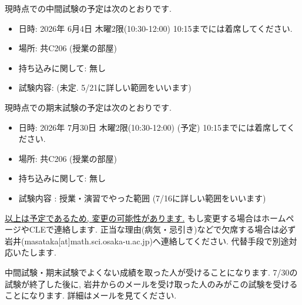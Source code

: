 \documentclass[dvipdfmx,a4paper,11pt]{article} %
\theoremstyle{definition}
\begin{document}
\medskip
{}

現時点での中間試験の予定は次のとおりです. 


\begin{tcolorbox}[mybox]
\begin{itemize}
  \setlength{\parskip}{0cm} 
  \setlength{\itemsep}{0cm}
\item 日時: 2026年 6月4日 木曜2限(10:30-12:00) 10:15までには着席してください.
\item 場所: 共C206 (授業の部屋)
\item 持ち込みに関して: 無し
\item 試験内容: (未定. 5/21に詳しい範囲をいいます)
\end{itemize}
\end{tcolorbox}

\medskip
{}

現時点での期末試験の予定は次のとおりです.

\begin{tcolorbox}[mybox] 
\begin{itemize}
  \setlength{\parskip}{0cm} 
  \setlength{\itemsep}{0cm}
\item 日時: 2026年 7月30日 木曜2限(10:30-12:00)  (予定) 10:15までには着席してください.
\item 場所: 共C206 (授業の部屋)
\item 持ち込みに関して: 無し
\item 試験内容 : 授業・演習でやった範囲 (7/16に詳しい範囲をいいます) 
\end{itemize}
\end{tcolorbox}
\underline{以上は予定であるため, 変更の可能性があります.} もし変更する場合はホームページやCLEで連絡します. 
正当な理由(病気・忌引き)などで欠席する場合は必ず岩井(masataka[at]math.sci.osaka-u.ac.jp)へ連絡してください. 代替手段で別途対応いたします.  

\medskip
{}

中間試験・期末試験でよくない成績を取った人が受けることになります. 
7/30の試験が終了した後に, 岩井からのメールを受け取った人のみがこの試験を受けることになります. 
詳細はメールを見てください. 
\end{document}
